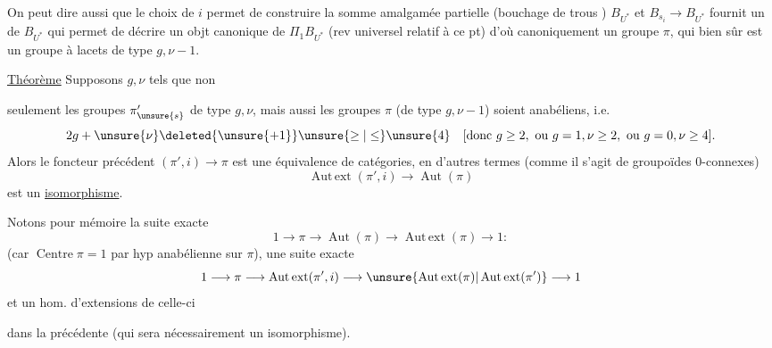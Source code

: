 On peut dire aussi que le choix de \(i\) permet de construire la somme amalgamée partielle (bouchage de trous ) \(B_{U^*}\)
et \(B_{s_i}\longrightarrow B_{U^*}\) fournit un  de \(B_{U^*}\) qui permet de décrire un objt canonique de \(\Pi_1B_{U^*}\) (rev universel relatif à ce pt) d'où canoniquement un groupe \(\pi\), qui bien sûr est un groupe à lacets de type \(g,\nu-1\).

\uline{Théorème} Supposons \(g,\nu\) tels que non


seulement les groupes \(\pi'_{\unsure{s}}\) de type \(g,\nu\), mais aussi les groupes \(\pi\) (de type \(g,\nu-1\)) soient anabéliens, i.e.
\[
2g+\unsure{\nu}\deleted{\unsure{+1}}\unsure{\ge|\le}\unsure{4}
\quad
[\text{donc }g\ge2,\ \text{ou }g=1,\nu\ge2,\ \text{ou }g=0,\nu\ge4].
\]
Alors le foncteur précédent \((\pi',i)\longrightarrow\pi\) est une équivalence de catégories, en d'autres termes (comme il s'agit de groupoïdes \(0\)-connexes)
\[
\operatorname{Aut\,ext}(\pi',i)\longrightarrow\operatorname{Aut}(\pi)
\]
est un \uline{isomorphisme}.

Notons pour mémoire la suite exacte
\[
1\longrightarrow\pi\longrightarrow\operatorname{Aut}(\pi)
\longrightarrow\operatorname{Aut\,ext}(\pi)\longrightarrow1:
\]
(car \(\operatorname{Centre}\pi=1\) par hyp anabélienne sur \(\pi\)),  une suite exacte
\[
1\longrightarrow\pi\longrightarrow\operatorname{Aut\,ext}(\pi',i)
\longrightarrow\unsure{\operatorname{Aut\,ext}(\pi)|\operatorname{Aut\,ext}(\pi')}
\longrightarrow1
\]
et un hom. d'extensions de celle-ci


dans la précédente (qui sera nécessairement un isomorphisme).

